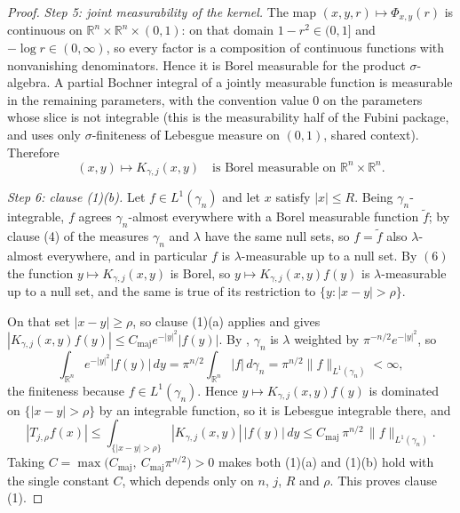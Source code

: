 \begin{proof}
\emph{Step 5: joint measurability of the kernel.}
The map
$(x,y,r) \mapsto \Phi_{x,y}(r)$ is continuous on
$\mathbb{R}^n\times\mathbb{R}^n\times(0,1)$: on that domain $1-r^2 \in (0,1]$
and $-\log r \in (0,\infty)$, so every factor is a composition of continuous
functions with nonvanishing denominators.  Hence it is Borel measurable for the
product $\sigma$-algebra.  A partial Bochner integral of a jointly measurable
function is measurable in the remaining parameters, with the convention value
$0$ on the parameters whose slice is not integrable (this is the measurability
half of the Fubini package, and uses only $\sigma$-finiteness of Lebesgue
measure on $(0,1)$, shared context).  Therefore
\begin{equation*}
  (x,y) \longmapsto K_{\gamma,j}(x,y)
  \quad\text{is Borel measurable on } \mathbb{R}^n\times\mathbb{R}^n . \tag{6}
\end{equation*}

\emph{Step 6: clause (1)(b).}
Let $f \in L^1(\gamma_n)$ and let $x$ satisfy $|x| \leq R$.  Being
$\gamma_n$-integrable, $f$ agrees $\gamma_n$-almost everywhere with a Borel
measurable function $\widetilde f$; by clause (4) of
 the measures $\gamma_n$ and $\lambda$ have
the same null sets, so $f = \widetilde f$ also $\lambda$-almost everywhere, and
in particular $f$ is $\lambda$-measurable up to a null set.  By $(6)$ the
function $y \mapsto K_{\gamma,j}(x,y)$ is Borel, so
$y \mapsto K_{\gamma,j}(x,y)f(y)$ is $\lambda$-measurable up to a null set, and
the same is true of its restriction to $\{y : |x-y| > \rho\}$.

On that set $|x-y| \geq \rho$, so clause (1)(a) applies and gives
$|K_{\gamma,j}(x,y)f(y)| \leq C_{\mathrm{maj}}e^{-|y|^2}|f(y)|$.  By
, $\gamma_n$ is $\lambda$ weighted by
$\pi^{-n/2}e^{-|y|^2}$, so
\begin{equation*}
  \int_{\mathbb{R}^n}e^{-|y|^2}|f(y)|\,dy
    = \pi^{n/2}\int_{\mathbb{R}^n}|f|\,d\gamma_n
    = \pi^{n/2}\|f\|_{L^1(\gamma_n)} < \infty , \tag{7}
\end{equation*}
the finiteness because $f \in L^1(\gamma_n)$.  Hence
$y \mapsto K_{\gamma,j}(x,y)f(y)$ is dominated on $\{|x-y|>\rho\}$ by an
integrable function, so it is Lebesgue integrable there, and
\[
  |T_{j,\rho}f(x)|
    \leq \int_{\{|x-y|>\rho\}}|K_{\gamma,j}(x,y)|\,|f(y)|\,dy
    \leq C_{\mathrm{maj}}\,\pi^{n/2}\,\|f\|_{L^1(\gamma_n)} .
\]
Taking $C = \max\bigl(C_{\mathrm{maj}},\ C_{\mathrm{maj}}\pi^{n/2}\bigr) > 0$
makes both (1)(a) and (1)(b) hold with the single constant $C$, which depends
only on $n$, $j$, $R$ and $\rho$.  This proves clause (1).


\end{proof}
